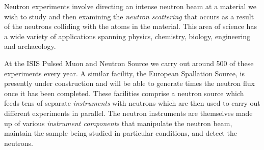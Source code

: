 Neutron experiments involve directing an intense neutron beam at a material we wish to study and then examining the \textit{neutron scattering} that occurs as a result of the neutrons colliding with the atoms in the material. This area of science has a wide variety of applications spanning physics, chemistry, biology, engineering and archaeology.

At the ISIS Pulsed Muon and Neutron Source we carry out around 500 of these experiments every year. A similar facility, the European Spallation Source, is presently under construction and will be able to generate  times the neutron flux once it has been completed. These facilities comprise a neutron source which feeds tens of separate \textit{instruments} with neutrons which are then used to carry out different experiments in parallel. The neutron instruments are themselves made up of various \textit{instrument components} that manipulate the neutron beam, maintain the sample being studied in particular conditions, and detect the neutrons.
